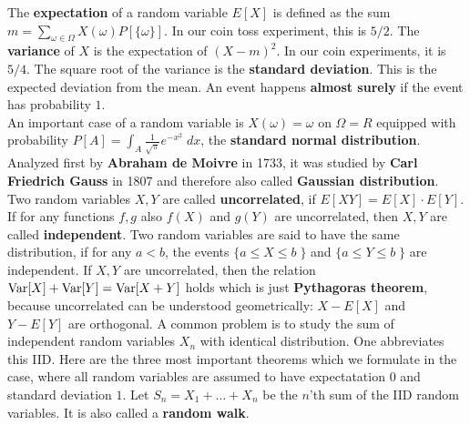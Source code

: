 \documentclass[12pt]{amsart}
\begin{document}
\begin{center}
 \end{center}

The {\bf expectation} of a random variable $E[X]$ is defined as the sum 
$m=\sum_{\omega \in \Omega} X(\omega ) P[\{ \omega \}]$. In our coin toss experiment, this is
$5/2$. The {\bf variance} of $X$ is the expectation of $(X-m)^2$. In our coin experiments, it is $5/4$. 
The square root of the variance is the {\bf standard deviation}. This is the expected deviation 
from the mean. An event happens {\bf almost surely} if the event has probability $1$. \\
An important case of a random variable is $X(\omega) = \omega$ on $\Omega=R$ equipped with probability
$P[A] = \int_A \frac{1}{\sqrt{\pi}} e^{-x^2} \; dx$, the {\bf standard normal
distribution}. Analyzed first by {\bf Abraham de Moivre} in 1733, it was studied by {\bf Carl Friedrich Gauss} in 1807 
and therefore also called {\bf Gaussian distribution}. \\  %
Two random variables $X,Y$ are called {\bf uncorrelated}, if $E[X Y] = E[X] \cdot E[Y]$. If for any 
functions $f,g$ also $f(X)$ and $g(Y)$ are uncorrelated, then $X,Y$ are called {\bf independent}. Two random 
variables are said to have the same distribution, if for any $a<b$, the events $\{ a \leq X \leq b \; \}$ and 
$\{ a \leq Y \leq b \; \}$ are independent. If $X,Y$ are uncorrelated, then the relation ${\rm Var}[X] + {\rm Var}[Y] = {\rm Var}[X+Y]$
holds which is just {\bf Pythagoras theorem}, because uncorrelated can be understood 
geometrically: $X-E[X]$ and $Y-E[Y]$ are orthogonal.
A common problem is to study the sum of independent random variables $X_n$ with identical
distribution. One abbreviates this IID. Here are the three most important theorems which we formulate in the case, where
all random variables are assumed to have expectatation $0$ and standard deviation $1$.
Let $S_n = X_1 + ... + X_n$ be the $n$'th sum of the IID 
random variables. It is also called a {\bf random walk}.  \\
\end{document}
